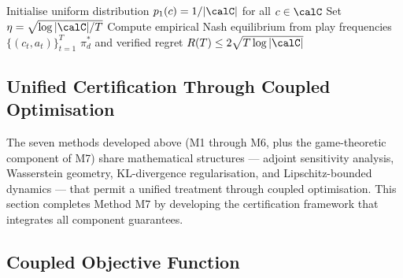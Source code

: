 \begin{algorithm}[htbp]
\caption{Game-Theoretic Robustness with Uncertainty-Guided Online Learning}\label{alg:game}
Initialise uniform distribution $p_1(c) = 1/|\calC|$ for all $c\in\calC$\;
Set $\eta = \sqrt{\log|\calC|/T}$\;
Compute empirical Nash equilibrium from play frequencies $\{(c_t,a_t)\}_{t=1}^T$\;
\Return $\pi_d^*$ and verified regret $R(T)\le 2\sqrt{T\log|\calC|}$
\end{algorithm}


\subsection{Unified Certification Through Coupled Optimisation}
\label{sec:unified}

The seven methods developed above (M1 through M6, plus the game-theoretic component of M7) share mathematical structures — adjoint sensitivity analysis, Wasserstein geometry, KL-divergence regularisation, and Lipschitz-bounded dynamics — that permit a unified treatment through coupled optimisation. This section completes Method M7 by developing the certification framework that integrates all component guarantees.

\subsection{Coupled Objective Function}


